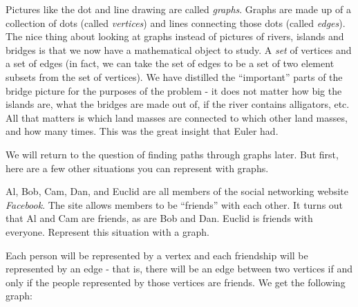 \documentclass[12pt]{article}
\begin{document}
Pictures like the dot and line drawing are called {\em graphs}.  Graphs are made up of a collection of dots (called {\em vertices}) and lines connecting those dots (called {\em edges}).  The nice thing about looking at graphs instead of pictures of rivers, islands and bridges is that we now have a mathematical object to study.  A {\em set} of vertices and a set of edges (in fact, we can take the set of edges to be a set of two element subsets from the set of vertices).  We have distilled the ``important'' parts of the bridge picture for the purposes of the problem - it does not matter how big the islands are, what the bridges are made out of, if the river contains alligators, etc.  All that matters is which land masses are connected to which other land masses, and how many times.  This was the great insight that Euler had.

We will return to the question of finding paths through graphs later.  But first, here are a few other situations you can represent with graphs.

\begin{example}
  Al, Bob, Cam, Dan, and Euclid are all members of the social networking website {\em Facebook}.  The site allows members to be ``friends'' with each other.  It turns out that Al and Cam are friends, as are Bob and Dan.  Euclid is friends with everyone.  Represent this situation with a graph.
  \begin{solution}
    Each person will be represented by a vertex and each friendship will be represented by an edge - that is, there will be an edge between two vertices if and only if the people represented by those vertices are friends.  We get the following graph:
    
    \begin{center}
    \end{center}
  \end{solution}

\end{example}
\end{document}
